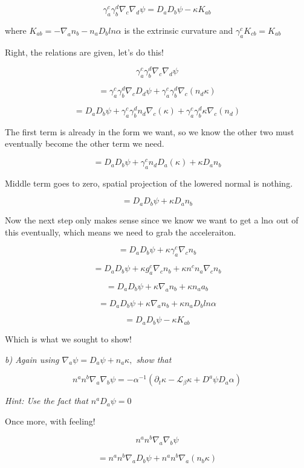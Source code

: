 \documentclass[landscape,letterpaper,10pt,english]{article}
\begin{document}
\[ \gamma^c_a \gamma^d_b \nabla_c \nabla_d \psi = D_a D_b \psi - \kappa K_{ab} \]

where \(K_{ab} = -\nabla_an_b - n_aD_b ln\alpha\) is the extrinsic
curvature and \(\gamma^c_a K_{cb} = K_{ab}\)

    Right, the relations are given, let's do this!

\[ \gamma^c_a \gamma^d_b \nabla_c \nabla_d \psi \]

\[ = \gamma^c_a \gamma^d_b \nabla_c D_d \psi + \gamma^c_a \gamma^d_b \nabla_c (n_d \kappa) \]

\[ = D_a D_b \psi + \gamma^c_a \gamma^d_b n_d \nabla_c (\kappa) + \gamma^c_a \gamma^d_b \kappa \nabla_c (n_d) \]

The first term is already in the form we want, so we know the other two
must eventually become the other term we need.

\[ = D_a D_b \psi + \gamma^c_a n_d D_a(\kappa) +  \kappa D_a n_b\]

Middle term goes to zero, spatial projection of the lowered normal is
nothing.

\[ = D_a D_b \psi + \kappa D_a n_b\]

Now the next step only makes sense since we know we want to get a
ln\(\alpha\) out of this eventually, which means we need to grab the
acceleraiton.

\[ = D_a D_b \psi + \kappa \gamma^c_a \nabla_c n_b \]

\[ = D_a D_b \psi + \kappa g^c_a \nabla_c n_b  + \kappa n^c n_a \nabla_c n_b\]

\[ = D_a D_b \psi + \kappa \nabla_a n_b  + \kappa n_a a_b\]

\[ = D_a D_b \psi + \kappa \nabla_a n_b  + \kappa n_a D_b ln\alpha\]

\[ = D_a D_b \psi - \kappa K_{ab}\]

Which is what we sought to show!

    \emph{b) Again using \(\nabla_a \psi = D_a \psi + n_a \kappa,\) show
that}

\[ n^an^b \nabla_a \nabla_b \psi = -\alpha^{-1} (\partial_t \kappa - \mathcal{L}_\beta \kappa + D^a \psi D_a \alpha) \]

\emph{Hint: Use the fact that \(n^a D_a \psi = 0\)}

    Once more, with feeling!

\[ n^an^b\nabla_a\nabla_b\psi \]

\[ = n^an^b\nabla_aD_b \psi + n^an^b\nabla_a(n_b \kappa) \]
\end{document}
